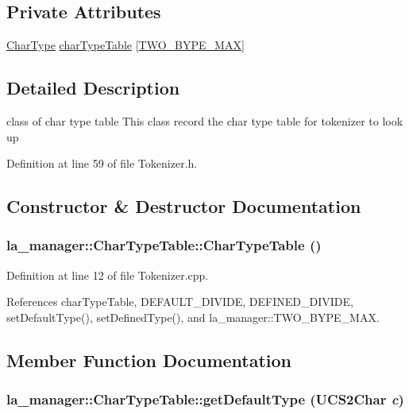 \subsection*{Private Attributes}
\begin{CompactItemize}
\item 
\hyperlink{namespacela__manager_aa4b42b4146948a208eabd25288ad99b}{CharType} \hyperlink{classla__manager_1_1CharTypeTable_a310585720c29aff0eed743865ead8fc}{charTypeTable} \mbox{[}\hyperlink{namespacela__manager_209bf4bd6bbc83558619fa8b8f6dc451}{TWO\_\-BYPE\_\-MAX}\mbox{]}
\end{CompactItemize}


\subsection{Detailed Description}
class of char type table This class record the char type table for tokenizer to look up 

Definition at line 59 of file Tokenizer.h.

\subsection{Constructor \& Destructor Documentation}
\hypertarget{classla__manager_1_1CharTypeTable_4faeb450b4c48e55459ade19145652a2}{
\subsubsection[{CharTypeTable}]{\setlength{\rightskip}{0pt plus 5cm}la\_\-manager::CharTypeTable::CharTypeTable ()}}
\label{classla__manager_1_1CharTypeTable_4faeb450b4c48e55459ade19145652a2}




Definition at line 12 of file Tokenizer.cpp.

References charTypeTable, DEFAULT\_\-DIVIDE, DEFINED\_\-DIVIDE, setDefaultType(), setDefinedType(), and la\_\-manager::TWO\_\-BYPE\_\-MAX.

\subsection{Member Function Documentation}
\hypertarget{classla__manager_1_1CharTypeTable_af12cb9b55886d533da4270683655d2b}{
\subsubsection[{getDefaultType}]{ la\_\-manager::CharTypeTable::getDefaultType (UCS2Char {\em c})}}
\label{classla__manager_1_1CharTypeTable_af12cb9b55886d533da4270683655d2b}


